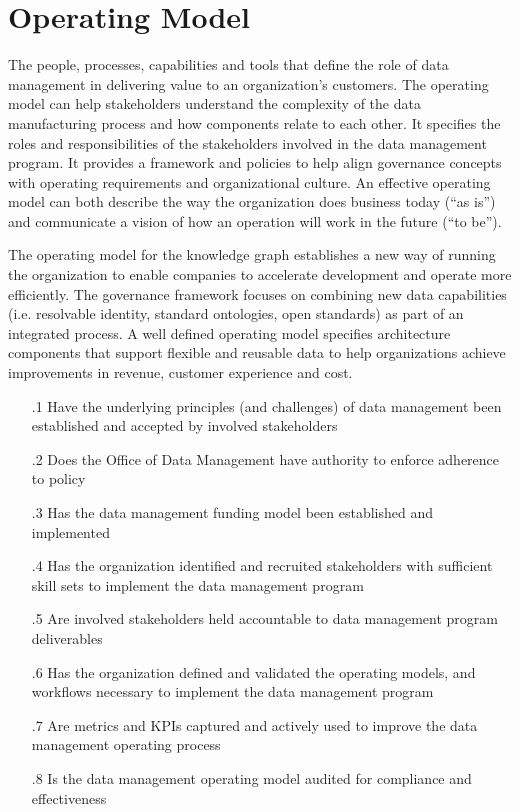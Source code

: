 \section{Operating Model}\label{sec:ekgmm-b-4-1} %

The people, processes, capabilities and tools that define the role of data management in delivering value to an organization’s customers.
The operating model can help stakeholders understand the complexity of the data manufacturing process and how components relate to each other.
It specifies the roles and responsibilities of the stakeholders involved in the data management program.
It provides a framework and policies to help align governance concepts with operating requirements and organizational culture.
An effective operating model can both describe the way the organization does business today (“as is”) and communicate a vision of how an operation will work in the future (“to be”).

\kgmmekgrationalesection

The operating model for the knowledge graph establishes a new way of running the organization to enable companies to accelerate development and operate more efficiently.
The  governance framework focuses on combining new data capabilities (i.e. resolvable identity, standard ontologies, open standards) as part of an integrated process.
A well defined operating model specifies architecture components that support flexible and reusable data to help organizations achieve improvements in revenue, customer experience and cost.

\kgmmcorequestionssection

\begin{itemize}[leftmargin=.5in]

  \item [\thesection.1] Have the underlying principles (and challenges) of data management been established and accepted by involved stakeholders
  \item [\thesection.2] Does the Office of Data Management have authority to enforce adherence to policy
  \item [\thesection.3] Has the data management funding model been established and implemented
  \item [\thesection.4] Has the organization identified and recruited stakeholders with sufficient skill sets to implement the data management program
  \item [\thesection.5] Are involved stakeholders held accountable to data management program deliverables
  \item [\thesection.6] Has the organization defined and validated the operating models, and workflows necessary to implement the data management program
  \item [\thesection.7] Are metrics and KPIs captured and actively used to improve the data management operating process
  \item [\thesection.8] Is the data management operating model audited for compliance and effectiveness

\end{itemize}
